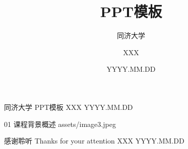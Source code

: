 \documentclass[aspectratio=169,fontset=none]{ctexbeamer}
\title{PPT模板}
\subtitle{同济大学}
\author{XXX}
\date{YYYY.MM.DD}
\begin{document}
\tongjicover
  {同济大学}
  {PPT模板}
  {XXX}
  {YYYY.MM.DD}


\tongjisectionpage
  {01}
  {课程背景概述}
  {assets/image3.jpeg}

\tongjithankspage
  {感谢聆听}
  {Thanks for your attention}
  {XXX}
  {YYYY.MM.DD}
\end{document}
